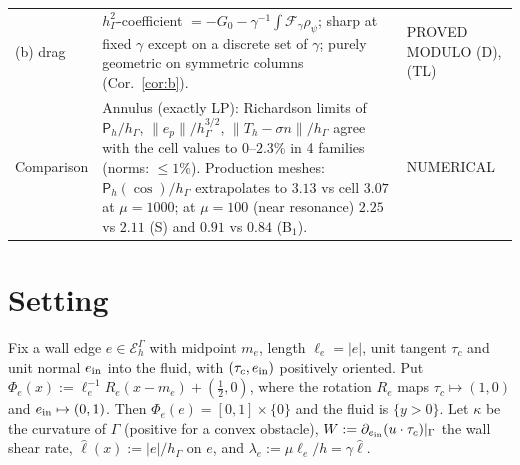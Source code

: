 \documentclass[11pt,reqno]{amsart}
\theoremstyle{plain}
\theoremstyle{definition}
\newcommand{\hG}{h_\Gamma}
\newcommand{\EG}{\mathcal E_h^\Gamma}
\newcommand{\norm}[1]{\lVert #1\rVert}
\newcommand{\Pm}{\mathsf P_h}
\begin{document}
\begin{center}
\begin{tabular}{>{\raggedright\arraybackslash}p{}>{\raggedright\arraybackslash}p{}>{\raggedright\arraybackslash}p{}}
(b) drag & $\hG^2$-coefficient $=-G_0-\gamma^{-1}\!\int\mathcal F_\gamma\rho_\psi$; sharp at fixed $\gamma$ except on a discrete set of $\gamma$; purely geometric on symmetric columns (Cor.~\ref{cor:b}). & PROVED MODULO (D), (TL)\\
Comparison & Annulus (exactly LP): Richardson limits of $\Pm/\hG$, $\norm{e_p}/\hG^{3/2}$, $\norm{T_h-\sigma n}/\hG$ agree with the cell values to $0$--$2.3\%$ in 4 families (norms: $\le1\%$). Production meshes: $\Pm(\cos)/\hG$ extrapolates to $3.13$ vs cell $3.07$ at $\mu=1000$; at $\mu=100$ (near resonance) $2.25$ vs $2.11$ (S) and $0.91$ vs $0.84$ (B$_1$). & NUMERICAL\\
\bottomrule
\end{tabular}
\end{center}

\section{Setting}

Fix a wall edge $e\in\EG$ with midpoint $m_e$, length $\ell_e=|e|$, unit tangent $\tau_c$ and unit normal $e_{\rm in}$ into the fluid, with $(\tau_c,e_{\rm in})$ positively oriented. Put $\Phi_e(x):=\ell_e^{-1}R_e(x-m_e)+(\tfrac12,0)$, where the rotation $R_e$ maps $\tau_c\mapsto(1,0)$ and $e_{\rm in}\mapsto(0,1)$. Then $\Phi_e(e)=[0,1]\times\{0\}$ and the fluid is $\{y>0\}$. Let $\kappa$ be the curvature of $\Gamma$ (positive for a convex obstacle), $W:=\partial_{e_{\rm in}}(u\cdot\tau_c)|_\Gamma$ the wall shear rate, $\hat\ell(x):=|e|/\hG$ on $e$, and $\lambda_e:=\mu\ell_e/h=\gamma\hat\ell$.
\end{document}
